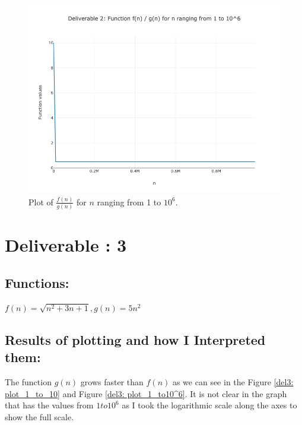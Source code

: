 \documentclass{article}
\begin{document}
\begin{figure}[H]
    \centering
    \includegraphics[width=\textwidth]{Deliverable 2: plot_1_to_1000000.png}
    \caption{Plot of \(\frac{f(n)}{g(n)}\) for $n$ ranging from 1 to $10^6$.}
    \label{del2: plot_1_to10^6}
\end{figure}

\section{Deliverable : 3}
\subsection{Functions: }
\(
    f(n) = \sqrt{n^2+3n+1} , g(n) = 5n^2
\)

\subsection{Results of plotting and how I Interpreted them: }

The function \(g(n)\) grows faster than \(f(n)\) as we can see in the Figure \ref{del3: plot_1_to_10} and Figure \ref{del3: plot_1_to10^6}.
It is not clear in the graph that has the values from \(1 to 10^6\) as I took the logarithmic scale along the axes to show the full scale.
\end{document}
